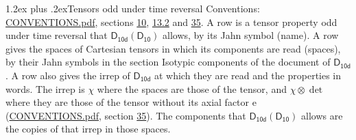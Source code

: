 \documentclass[10pt,a4paper]{article}
\makeatletter
\renewcommand\section{\@startsection{section}{1}{\z@}{-3ex plus -1ex minus -.2ex}%
  {1.2ex plus .2ex}{\normalfont\large\sffamily\bfseries\color{parttitle}}}
\numberwithin{equation}{section}
\newcommand{\grp}[1]{\mathsf{#1}}
\newcommand{\irrprod}{\otimes}
\makeatother
\begin{document}
\section{Tensors odd under time reversal}\label{s:time_odd}
Conventions: \href{../../CONVENTIONS.pdf}{CONVENTIONS.pdf}, sections \href{../../../rotation/CONVENTIONS.pdf\#conv.10}{10}, \href{../../../rotation/CONVENTIONS.pdf\#conv.13.2}{13.2} and \href{../../CONVENTIONS.pdf\#conv.35}{35}.
\leavevmode\label{n:head.name.property}A row is a tensor property odd under time reversal that $\grp{D_{10d}}(\grp{D_{10}})$ allows, by its Jahn symbol (name). \label{n:head.spaces}A row gives the spaces of Cartesian tensors in which its components are read (spaces), by their Jahn symbols in the section Isotypic components of the document of \href{../../../rotation/data/pdf/D10d.pdf}{$\grp{D_{10d}}$}. \label{n:head.properties}A row also gives the irrep of $\grp{D_{10d}}$ at which they are read and the properties in words. The irrep is $\chi$ where the spaces are those of the tensor, and $\chi \irrprod \det$ where they are those of the tensor without its axial factor e (\href{../../CONVENTIONS.pdf}{CONVENTIONS.pdf}, section \href{../../CONVENTIONS.pdf\#conv.35}{35}). The components that $\grp{D_{10d}}(\grp{D_{10}})$ allows are the copies of that irrep in those spaces.
\end{document}
